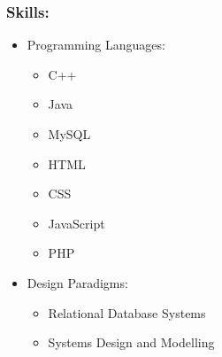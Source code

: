 \documentclass[12pt]{article}
\begin{document}
	\subsubsection{Skills:}
	\begin{itemize}
	\item Programming Languages:
	\begin{itemize}
	\item C++
	\item Java
	\item MySQL
	\item HTML
	\item CSS
	\item JavaScript
	\item PHP
	\end{itemize}
	\item Design Paradigms:
	\begin{itemize}
	\item Relational Database Systems
	\item Systems Design and Modelling
	\end{itemize}
	\end{itemize}
	
\end{document}
